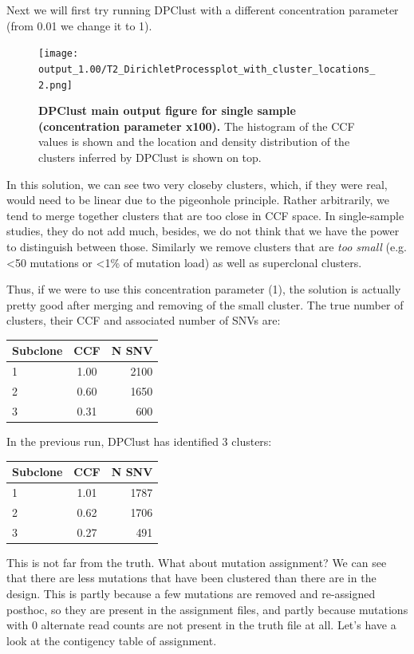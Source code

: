 \documentclass[]{article}
\begin{document}
Next we will first try running DPClust with a different concentration
parameter (from 0.01 we change it to 1).

\begin{figure}[H]
  \centering
  \texttt{[image: output\_1.00/T2\_DirichletProcessplot\_with\_cluster\_locations\_2.png]}
  \caption{\textbf{DPClust main output figure for single sample (concentration parameter x100).}
  The histogram of the CCF values is shown and the location and
  density distribution of the clusters inferred by DPClust is shown on top.}
  \label{Figure7}
\end{figure}

In this solution, we can see two very closeby clusters, which, if they
were real, would need to be linear due to the pigeonhole principle.
Rather arbitrarily, we tend to merge together clusters that are too
close in CCF space. In single-sample studies, they do not add much,
besides, we do not think that we have the power to distinguish between
those. Similarly we remove clusters that are \emph{too small} (e.g.
\textless{}50 mutations or \textless{}1\% of mutation load) as well as
superclonal clusters.

Thus, if we were to use this concentration parameter (1), the solution
is actually pretty good after merging and removing of the small cluster.
The true number of clusters, their CCF and associated number of SNVs
are:

\begin{longtable}[]{@{}lcr@{}}
\toprule
Subclone & CCF & N SNV\tabularnewline
\midrule
\endhead
1 & 1.00 & 2100\tabularnewline
2 & 0.60 & 1650\tabularnewline
3 & 0.31 & 600\tabularnewline
\bottomrule
\end{longtable}

In the previous run, DPClust has identified 3 clusters:

\begin{longtable}[]{@{}lcr@{}}
\toprule
Subclone & CCF & N SNV\tabularnewline
\midrule
\endhead
1 & 1.01 & 1787\tabularnewline
2 & 0.62 & 1706\tabularnewline
3 & 0.27 & 491\tabularnewline
\bottomrule
\end{longtable}

This is not far from the truth. What about mutation assignment? We can
see that there are less mutations that have been clustered than there
are in the design. This is partly because a few mutations are removed
and re-assigned posthoc, so they are present in the assignment files,
and partly because mutations with 0 alternate read counts are not
present in the truth file at all. Let's have a look at the contigency
table of assignment.
\end{document}
